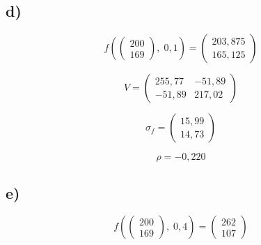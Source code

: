 \subsection*{d)}
\begin{equation}
    f\left(\left(\begin{matrix}
            200\\
            169
        \end{matrix}\right),\; 0,1 \right) = \left(\begin{matrix}
                                                    203,875\\
                                                    165,125
                                                \end{matrix}\right)
\end{equation}

\begin{equation}
    V = \left(\begin{matrix}
            255,77 & -51,89\\
            -51,89 & 217,02
        \end{matrix}\right)
\end{equation}

\begin{equation}
    \sigma_f = \left(\begin{matrix}
                    15,99\\
                    14,73
                \end{matrix}\right)
\end{equation}

\begin{equation}
    \rho = -0,220
\end{equation}

\subsection*{e)}

\begin{equation}
    f(\left(\begin{matrix}
            200\\
            169
        \end{matrix}\right) ,\; 0,4 ) = \left(\begin{matrix}
                                            262\\
                                            107
                                        \end{matrix}\right)
\end{equation}


